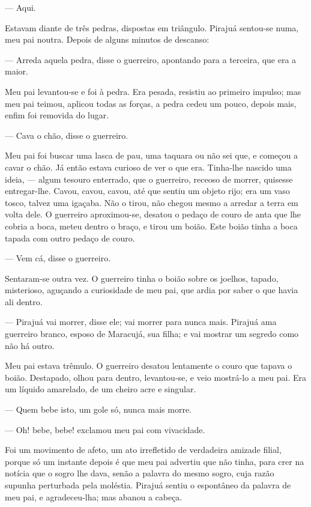 --- Aqui.

Estavam diante de três pedras, dispostas em triângulo. Pirajuá
sentou-se numa, meu pai noutra. Depois de alguns minutos de descanso:

--- Arreda aquela pedra, disse o guerreiro, apontando para a terceira,
que era a maior.

Meu pai levantou-se e foi à pedra. Era pesada, resistiu ao primeiro
impulso; mas meu pai teimou, aplicou todas as forças, a pedra cedeu um
pouco, depois mais, enfim foi removida do lugar.

--- Cava o chão, disse o guerreiro.

Meu pai foi buscar uma lasca de pau, uma taquara ou não sei que, e
começou a cavar o chão. Já então estava curioso de ver o que era.
Tinha-lhe nascido uma ideia, --- algum tesouro enterrado, que o
guerreiro, receoso de morrer, quisesse entregar-lhe. Cavou, cavou,
cavou, até que sentiu um objeto rijo; era um vaso tosco, talvez uma
igaçaba. Não o tirou, não chegou mesmo a arredar a terra em volta dele.
O guerreiro aproximou-se, desatou o pedaço de couro de anta que lhe
cobria a boca, meteu dentro o braço, e tirou um boião. Este boião tinha
a boca tapada com outro pedaço de couro.

--- Vem cá, disse o guerreiro.

Sentaram-se outra vez. O guerreiro tinha o boião sobre os joelhos,
tapado, misterioso, aguçando a curiosidade de meu pai, que ardia por
saber o que havia ali dentro.

--- Pirajuá vai morrer, disse ele; vai morrer para nunca mais. Pirajuá
ama guerreiro branco, esposo de Maracujá, sua filha; e vai mostrar um
segredo como não há outro.

Meu pai estava trêmulo. O guerreiro desatou lentamente o couro que
tapava o boião. Destapado, olhou para dentro, levantou-se, e veio
mostrá-lo a meu pai. Era um líquido amarelado, de um cheiro acre e
singular.

--- Quem bebe isto, um gole só, nunca mais morre.

--- Oh! bebe, bebe! exclamou meu pai com vivacidade.

Foi um movimento de afeto, um ato irrefletido de verdadeira amizade
filial, porque só um instante depois é que meu pai advertiu que não
tinha, para crer na notícia que o sogro lhe dava, senão a palavra do
mesmo sogro, cuja razão supunha perturbada pela moléstia. Pirajuá sentiu
o espontâneo da palavra de meu pai, e agradeceu-lha; mas abanou a
cabeça.

